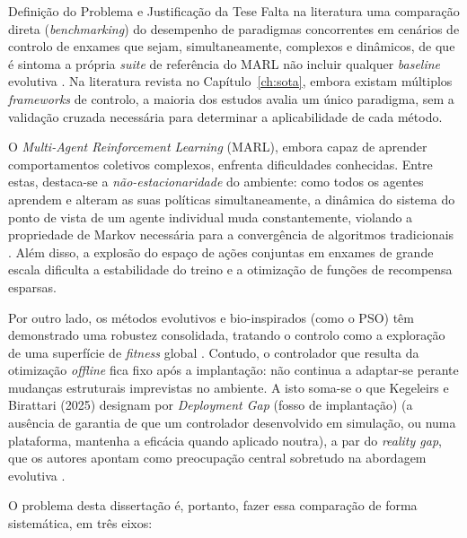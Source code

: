 \documentclass[12pt,reqno, twoside]{amsbook}
\makeatletter
\def\section{\@startsection{section}{1}%
      \z@{.5\linespacing\@plus.7\linespacing}{.25\linespacing}%
      {\normalfont\bfseries\flushleft}}
\theoremstyle{plain}
\numberwithin{equation}{chapter}
\numberwithin{section}{chapter}
\numberwithin{table}{chapter}
\numberwithin{figure}{chapter}
\makeatother
\begin{document}
\section{Definição do Problema e Justificação da Tese}
Falta na literatura uma comparação direta (\textit{benchmarking}) do desempenho de paradigmas concorrentes em cenários de controlo de enxames que sejam, simultaneamente, complexos e dinâmicos, de que é sintoma a própria \textit{suite} de referência do MARL não incluir qualquer \textit{baseline} evolutiva \cite{bettini2024benchmarl}. Na literatura revista no Capítulo~\ref{ch:sota}, embora existam múltiplos \textit{frameworks} de controlo, a maioria dos estudos avalia um único paradigma, sem a validação cruzada necessária para determinar a aplicabilidade de cada método.

O \textit{Multi-Agent Reinforcement Learning} (MARL), embora capaz de aprender comportamentos coletivos complexos, enfrenta dificuldades conhecidas. Entre estas, destaca-se a \emph{não-estacionaridade} do ambiente: como todos os agentes aprendem e alteram as suas políticas simultaneamente, a dinâmica do sistema do ponto de vista de um agente individual muda constantemente, violando a propriedade de Markov necessária para a convergência de algoritmos tradicionais \cite{huh2023marl}. Além disso, a explosão do espaço de ações conjuntas em enxames de grande escala dificulta a estabilidade do treino e a otimização de funções de recompensa esparsas.

Por outro lado, os métodos evolutivos e bio-inspirados (como o PSO) têm demonstrado uma robustez consolidada, tratando o controlo como a exploração de uma superfície de \textit{fitness} global \cite{kennedy1995pso}. Contudo, o controlador que resulta da otimização \textit{offline} fica fixo após a implantação: não continua a adaptar-se perante mudanças estruturais imprevistas no ambiente. A isto soma-se o que Kegeleirs e Birattari (2025) designam por \textit{Deployment Gap} (fosso de implantação) (a ausência de garantia de que um controlador desenvolvido em simulação, ou numa plataforma, mantenha a eficácia quando aplicado noutra), a par do \textit{reality gap}, que os autores apontam como preocupação central sobretudo na abordagem evolutiva \cite{kegeleirs2025towards}.

O problema desta dissertação é, portanto, fazer essa comparação de forma sistemática, em três eixos:
\end{document}
